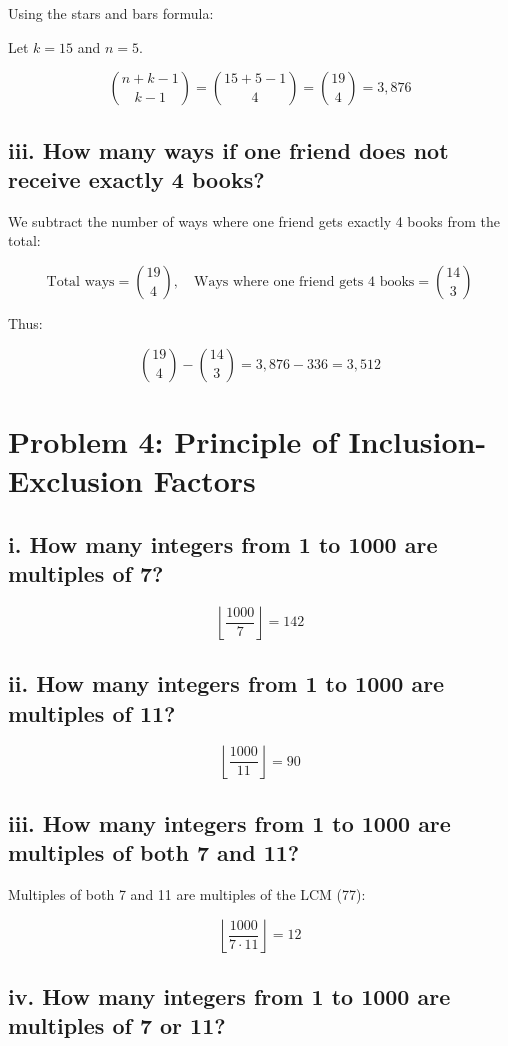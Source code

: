 \documentclass{article}
\begin{document}
Using the stars and bars formula:

\noindent Let $k=15$ and $n=5$.

\[
\binom{n+k-1}{k-1} = \binom{15+5-1}{4} = \binom{19}{4} = 3,876
\]

\subsection*{iii. How many ways if one friend does not receive exactly 4 books?}

We subtract the number of ways where one friend gets exactly 4 books from the total:

\[
\text{Total ways} = \binom{19}{4}, \quad \text{Ways where one friend gets 4 books} = \binom{14}{3}
\]

Thus:

\[
\binom{19}{4} - \binom{14}{3} = 3,876 - 336 = 3,512
\]

\newpage

\section*{Problem 4: Principle of Inclusion-Exclusion Factors}

\subsection*{i. How many integers from 1 to 1000 are multiples of 7?}

\[
\left\lfloor \frac{1000}{7} \right\rfloor = 142
\]

\subsection*{ii. How many integers from 1 to 1000 are multiples of 11?}

\[
\left\lfloor \frac{1000}{11} \right\rfloor = 90
\]

\subsection*{iii. How many integers from 1 to 1000 are multiples of both 7 and 11?}

Multiples of both 7 and 11 are multiples of the LCM (77):

\[
\left\lfloor \frac{1000}{7 \cdot 11} \right\rfloor = 12
\]

\subsection*{iv. How many integers from 1 to 1000 are multiples of 7 or 11?}
\end{document}
